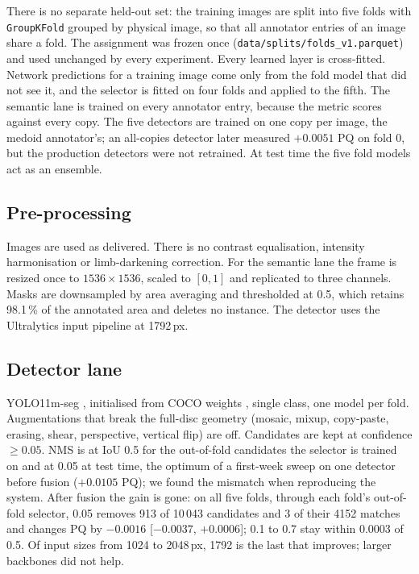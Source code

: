 \documentclass[sigconf]{acmart}
\begin{document}
There is no separate held-out set: the training images are split into five folds with \texttt{GroupKFold} grouped by physical image, so that all annotator entries of an image share a fold. The assignment was frozen once (\texttt{data/splits/folds\_v1.parquet}) and used unchanged by every experiment. Every learned layer is cross-fitted. Network predictions for a training image come only from the fold model that did not see it, and the selector is fitted on four folds and applied to the fifth. The semantic lane is trained on every annotator entry, because the metric scores against every copy. The five detectors are trained on one copy per image, the medoid annotator's; an all-copies detector later measured $+0.0051$ PQ on fold 0, but the production detectors were not retrained. At test time the five fold models act as an ensemble.

\subsection{Pre-processing}
Images are used as delivered. There is no contrast equalisation, intensity harmonisation or limb-darkening correction. For the semantic lane the frame is resized once to $1536\times1536$, scaled to $[0,1]$ and replicated to three channels. Masks are downsampled by area averaging and thresholded at 0.5, which retains 98.1\,\% of the annotated area and deletes no instance. The detector uses the Ultralytics input pipeline at 1792\,px.

\subsection{Detector lane}
YOLO11m-seg \cite{yolo11}, initialised from COCO weights \cite{lin2014coco}, single class, one model per fold. Augmentations that break the full-disc geometry (mosaic, mixup, copy-paste, erasing, shear, perspective, vertical flip) are off. Candidates are kept at confidence $\geq 0.05$. NMS is at IoU 0.5 for the out-of-fold candidates the selector is trained on and at 0.05 at test time, the optimum of a first-week sweep on one detector before fusion ($+0.0105$ PQ); we found the mismatch when reproducing the system. After fusion the gain is gone: on all five folds, through each fold's out-of-fold selector, 0.05 removes 913 of 10\,043 candidates and 3 of their 4152 matches and changes PQ by $-0.0016$ [$-0.0037$, $+0.0006$]; 0.1 to 0.7 stay within 0.0003 of 0.5. Of input sizes from 1024 to 2048\,px, 1792 is the last that improves; larger backbones did not help.
\end{document}
